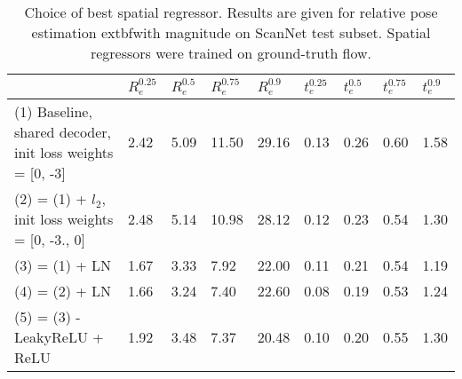 \begin{table}[h!]
\centering
\caption{Choice of best spatial regressor. Results are given for relative pose estimation 	extbf{with magnitude} on ScanNet test subset. Spatial regressors were trained on ground-truth flow.}
\label{tab:choice}
\begin{tabular}{lllllllll}
\toprule
 & $R_e^0.25$ & $R_e^0.5$ & $R_e^0.75$ & $R_e^0.9$ & $t_e^0.25$ & $t_e^0.5$ & $t_e^0.75$ & $t_e^0.9$ \\
\midrule
(1) Baseline, shared decoder, init loss weights = [0, -3] & {\cellcolor[HTML]{C21C27}} \color[HTML]{F1F1F1} 2.42 & {\cellcolor[HTML]{B10B26}} \color[HTML]{F1F1F1} 5.09 & {\cellcolor[HTML]{A50026}} \color[HTML]{F1F1F1} 11.50 & {\cellcolor[HTML]{A50026}} \color[HTML]{F1F1F1} 29.16 & {\cellcolor[HTML]{A50026}} \color[HTML]{F1F1F1} 0.13 & {\cellcolor[HTML]{A50026}} \color[HTML]{F1F1F1} 0.26 & {\cellcolor[HTML]{A50026}} \color[HTML]{F1F1F1} 0.60 & {\cellcolor[HTML]{A50026}} \color[HTML]{F1F1F1} 1.58 \\
(2) = (1) + $l_2$, init loss weights = [0, -3., 0] & {\cellcolor[HTML]{A50026}} \color[HTML]{F1F1F1} 2.48 & {\cellcolor[HTML]{A50026}} \color[HTML]{F1F1F1} 5.14 & {\cellcolor[HTML]{DC3B2C}} \color[HTML]{F1F1F1} 10.98 & {\cellcolor[HTML]{DC3B2C}} \color[HTML]{F1F1F1} 28.12 & {\cellcolor[HTML]{F98E52}} \color[HTML]{F1F1F1} 0.12 & {\cellcolor[HTML]{F67F4B}} \color[HTML]{F1F1F1} 0.23 & {\cellcolor[HTML]{F88950}} \color[HTML]{F1F1F1} 0.54 & {\cellcolor[HTML]{F5FBB2}} \color[HTML]{000000} 1.30 \\
(3) = (1) + LN & {\cellcolor[HTML]{1E9A51}} \color[HTML]{F1F1F1} 1.67 & {\cellcolor[HTML]{3FAA59}} \color[HTML]{F1F1F1} 3.33 & {\cellcolor[HTML]{4BB05C}} \color[HTML]{F1F1F1} 7.92 & {\cellcolor[HTML]{51B35E}} \color[HTML]{F1F1F1} 22.00 & {\cellcolor[HTML]{FEEDA1}} \color[HTML]{000000} 0.11 & {\cellcolor[HTML]{FFF3AC}} \color[HTML]{000000} 0.21 & {\cellcolor[HTML]{F7814C}} \color[HTML]{F1F1F1} 0.54 & {\cellcolor[HTML]{93D168}} \color[HTML]{000000} 1.19 \\
(4) = (2) + LN & {\cellcolor[HTML]{199750}} \color[HTML]{F1F1F1} 1.66 & {\cellcolor[HTML]{1E9A51}} \color[HTML]{F1F1F1} 3.24 & {\cellcolor[HTML]{0B7D42}} \color[HTML]{F1F1F1} 7.40 & {\cellcolor[HTML]{82C966}} \color[HTML]{000000} 22.60 & {\cellcolor[HTML]{249D53}} \color[HTML]{F1F1F1} 0.08 & {\cellcolor[HTML]{BBE278}} \color[HTML]{000000} 0.19 & {\cellcolor[HTML]{FDB163}} \color[HTML]{000000} 0.53 & {\cellcolor[HTML]{C3E67D}} \color[HTML]{000000} 1.24 \\
(5) = (3) - LeakyReLU + ReLU & {\cellcolor[HTML]{D5ED88}} \color[HTML]{000000} 1.92 & {\cellcolor[HTML]{73C264}} \color[HTML]{000000} 3.48 & {\cellcolor[HTML]{097940}} \color[HTML]{F1F1F1} 7.37 & {\cellcolor[HTML]{006837}} \color[HTML]{F1F1F1} 20.48 & {\cellcolor[HTML]{CBE982}} \color[HTML]{000000} 0.10 & {\cellcolor[HTML]{FBFDBA}} \color[HTML]{000000} 0.20 & {\cellcolor[HTML]{F57748}} \color[HTML]{F1F1F1} 0.55 & {\cellcolor[HTML]{F7FCB4}} \color[HTML]{000000} 1.30 \\

\end{tabular}
\end{table}
